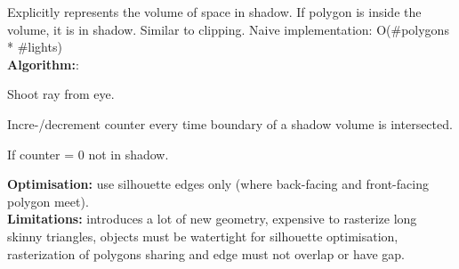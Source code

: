  Explicitly represents the volume of space in shadow. If polygon is inside the volume, it is in shadow. Similar to clipping. Naive implementation: O(\#polygons * \#lights)\\
\textbf{Algorithm:}: 
\begin{compactitem}
    \item Shoot ray from eye.
    \item Incre-/decrement counter every time boundary of a shadow volume is intersected.
    \item If counter = 0 not in shadow.
\end{compactitem}
\textbf{Optimisation:} use silhouette edges only (where back-facing and front-facing polygon meet).\\
\textbf{Limitations:} introduces a lot of new geometry, expensive to rasterize long skinny triangles, objects must be watertight for silhouette optimisation, rasterization of polygons sharing and edge must not overlap or have gap.

